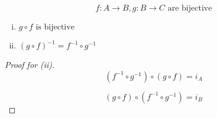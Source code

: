 \begin{frame}{}
  \begin{theorem}
    \[
      f: A \to B, g: B \to C \text{ are bijective}
    \]

    \begin{enumerate}[(i)]
      \item $g \circ f \text{ is bijective}$
      \item $(g \circ f)^{-1} = f^{-1} \circ g^{-1}$
    \end{enumerate}
  \end{theorem}

  \begin{proof}[Proof for (ii)]
    \[
      (f^{-1} \circ g^{-1}) \circ (g \circ f) = i_A
    \]

    \[
      (g \circ f) \circ (f^{-1} \circ g^{-1}) = i_B
    \]
  \end{proof}
\end{frame}
